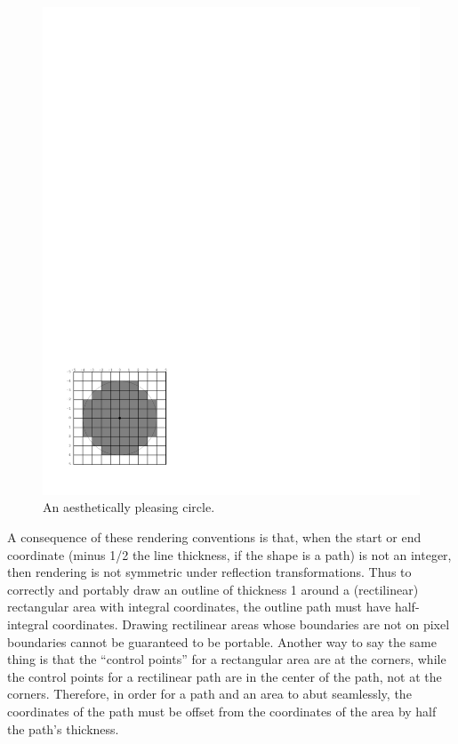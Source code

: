 \begin{figure}
\centerline{\includegraphics{correct-circle}}
\caption{\label{correct-circle} An aesthetically pleasing circle.}
\end{figure}

A consequence of these rendering conventions is that, when the start or end
coordinate (minus 1/2 the line thickness, if the shape is a path) is not an
integer, then rendering is not symmetric under reflection transformations.  Thus
to correctly and portably draw an outline of thickness 1 around a (rectilinear)
rectangular area with integral coordinates, the outline path must have
half-integral coordinates.  Drawing rectilinear areas whose boundaries are not
on pixel boundaries cannot be guaranteed to be portable.  Another way to say the
same thing is that the ``control points'' for a rectangular area are at the
corners, while the control points for a rectilinear path are in the center of
the path, not at the corners.  Therefore, in order for a path and an area to
abut seamlessly, the coordinates of the path must be offset from the coordinates
of the area by half the path's thickness.

